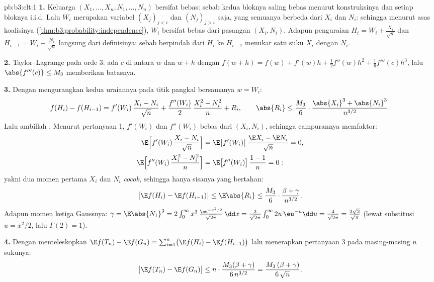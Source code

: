 \begin{solution}{pb:b3:clt:1}
\textbf{1.} Keluarga $(X_1, \dots, X_n, N_1, \dots, N_n)$
bersifat bebas: sebab kedua bloknya saling bebas
menurut konstruksinya dan setiap bloknya i.i.d. Lalu $W_i$ merupakan
 variabel $(X_j)_{j<i}$ dan
$(N_j)_{j>i}$ saja, yang semuanya berbeda dari $X_i$ dan $N_i$: sehingga menurut
asas koalisinya
(\cref{thm:b3:probability:independence}), $W_i$ bersifat
bebas dari pasangan $(X_i, N_i)$. Adapun penguraian
$H_i = W_i + \frac{X_i}{\sqrt n}$ dan $H_{i-1} = W_i +
\frac{N_i}{\sqrt n}$ langsung dari definisinya:
sebab berpindah dari $H_i$ ke $H_{i-1}$ menukar satu suku
$X_i$ dengan $N_i$.

\textbf{2.} Taylor--Lagrange pada orde $3$: ada $c$
di antara $w$ dan $w + h$ dengan $f(w + h) = f(w) + f'(w)h +
\frac12f''(w)h^2 + \frac16f'''(c)h^3$, lalu $\abs{f'''(c)}
\leq M_3$ memberikan batasnya.

\textbf{3.} Dengan mengurangkan kedua uraiannya pada titik
pangkal bersamanya $w = W_i$:
\[
f(H_i) - f(H_{i-1}) = f'(W_i)\,\frac{X_i - N_i}{\sqrt n} +
\frac{f''(W_i)}{2}\,\frac{X_i^2 - N_i^2}{n} + R_i,
\qquad
\abs{R_i} \leq \frac{M_3}{6}\cdot
\frac{\abs{X_i}^3 + \abs{N_i}^3}{n^{3/2}} .
\]
Lalu ambillah . Menurut pertanyaan 1, $f'(W_i)$ dan $f''(W_i)$
bebas dari $(X_i, N_i)$, sehingga  campurannya
memfaktor:
\begin{align*}
\E\Bigl[f'(W_i)\,\frac{X_i - N_i}{\sqrt n}\Bigr] &=
\E\bigl[f'(W_i)\bigr]\,\frac{\E X_i - \E N_i}{\sqrt n} = 0,
\\
\E\Bigl[f''(W_i)\,\frac{X_i^2 - N_i^2}{n}\Bigr] &=
\E\bigl[f''(W_i)\bigr]\,\frac{1 - 1}{n} = 0 :
\end{align*}
yakni dua momen pertama $X_i$ dan $N_i$ \emph{cocok}, sehingga
hanya sisanya yang bertahan:
\[
\bigl|\E f(H_i) - \E f(H_{i-1})\bigr| \leq \E\abs{R_i} \leq
\frac{M_3}{6}\cdot\frac{\beta + \gamma}{n^{3/2}} .
\]
Adapun momen ketiga Gaussnya: $\gamma = \E\abs{N_1}^3 =
2\int_0^\infty x^3\,\frac{\eu^{-x^2/2}}{\sqrt{2\pi}}\,\dd x
= \frac{2}{\sqrt{2\pi}}\int_0^\infty 2u\,\eu^{-u}\dd u =
\frac{4}{\sqrt{2\pi}} = \frac{2\sqrt2}{\sqrt\pi}$
(lewat substitusi $u = x^2/2$, lalu $\Gamma(2) = 1$).

\textbf{4.} Dengan menteleskopkan $\E f(T_n) - \E f(G_n) =
\sum_{i=1}^n\bigl(\E f(H_i) - \E f(H_{i-1})\bigr)$ lalu
menerapkan pertanyaan 3 pada masing-masing $n$ sukunya:
\[
\bigl|\E f(T_n) - \E f(G_n)\bigr| \leq
n \cdot \frac{M_3(\beta + \gamma)}{6\,n^{3/2}} =
\frac{M_3\,(\beta + \gamma)}{6\,\sqrt n} .
\]


\end{solution}

